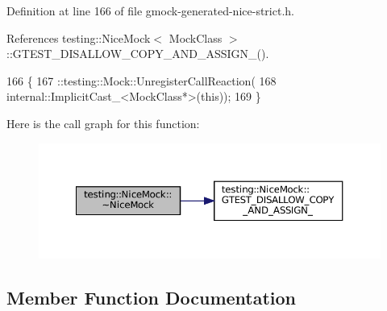Definition at line 166 of file gmock-\/generated-\/nice-\/strict.\+h.



References testing\+::\+Nice\+Mock$<$ Mock\+Class $>$\+::\+G\+T\+E\+S\+T\+\_\+\+D\+I\+S\+A\+L\+L\+O\+W\+\_\+\+C\+O\+P\+Y\+\_\+\+A\+N\+D\+\_\+\+A\+S\+S\+I\+G\+N\+\_\+().


\begin{DoxyCode}
166                       \{
167     ::testing::Mock::UnregisterCallReaction(
168         internal::ImplicitCast\_<MockClass*>(\textcolor{keyword}{this}));
169   \}
\end{DoxyCode}
Here is the call graph for this function\+:
\nopagebreak
\begin{figure}[H]
\begin{center}
\leavevmode
\includegraphics[width=350pt]{classtesting_1_1NiceMock_a4aaa6bd3850de6b6baa408010909a25f_cgraph}
\end{center}
\end{figure}


\subsection{Member Function Documentation}
\mbox{\label{classtesting_1_1NiceMock_aee46eca734708818a8af94624eb512dd}} 
